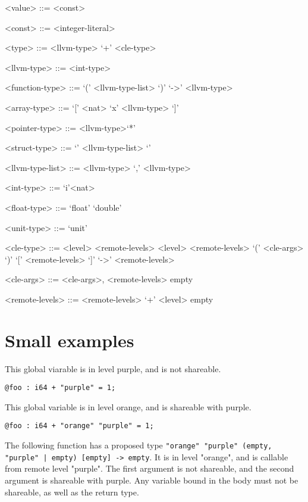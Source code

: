 \documentclass{article}
\begin{document}
\begin{grammar}
<value> ::= <const>

<const> ::= <integer-literal>

<type> ::= <llvm-type> `+' <cle-type>

<llvm-type> ::= <int-type>

<function-type> ::= `(' <llvm-type-list> `)' `->' <llvm-type>

<array-type> ::= `[' <nat> `x' <llvm-type> `]'

<pointer-type> ::= <llvm-type>`*'

<struct-type> ::= `{' <llvm-type-list> `}'

<llvm-type-list> ::= <llvm-type>
`,' <llvm-type>

<int-type> ::= `i'<nat>

<float-type> ::= `float' 
\alt `double'

<unit-type> ::= `unit'

<cle-type> ::= <level> <remote-levels> 
\alt <level> <remote-levels> `(' <cle-args> `)' `[' <remote-levels> `]' `->' <remote-levels> 

<cle-args> ::= <cle-args>, <remote-levels> \alt empty

<remote-levels> ::=  <remote-levels> `+' <level> \alt empty 

\end{grammar}

\section{Small examples}

This global viarable is in level purple, and is not shareable.
\begin{verbatim}
@foo : i64 + "purple" = 1;
\end{verbatim}


This global variable is in level orange, and is shareable with purple.
\begin{verbatim}
@foo : i64 + "orange" "purple" = 1;
\end{verbatim}

The following function has a proposed type \texttt{"orange" "purple" (empty, "purple" | empty) [empty] -> empty}.
It is in level "orange", and is callable from remote level "purple".
The first argument is not shareable, 
and the second argument is shareable with purple. 
Any variable bound in the body must not be shareable, as well as the return type.
\end{document}
